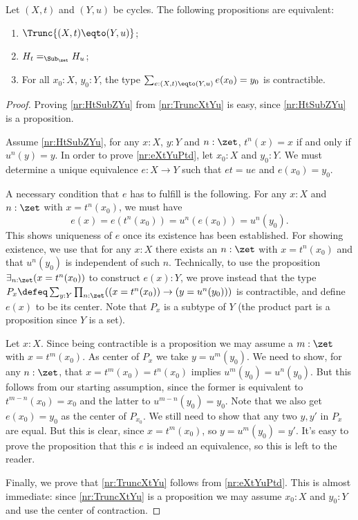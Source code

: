 \begin{lemma}\label{lem:IdCycle}
Let $(X,t)$ and $(Y,u)$ be cycles. The following propositions
are equivalent:
\begin{enumerate}
\item\label{nr:TruncXtYu} $\Trunc{(X,t)\eqto(Y,u)}$;
\item\label{nr:HtSubZYu} $H_t =_{\Sub_\zet} H_u$;
\item\label{nr:eXtYuPtd} For all $x_0:X$, $y_0:Y$, the type
$\sum_{e:(X,t)\eqto(Y,u)} e(x_0) = y_0$ is contractible.
\end{enumerate}
\end{lemma}
\begin{proof}
  Proving \ref{nr:HtSubZYu} from \ref{nr:TruncXtYu} is easy,
  since \ref{nr:HtSubZYu} is a proposition.
  
  Assume \ref{nr:HtSubZYu}, \ie for any $x:X$, $y:Y$ and $n:\zet$,
  $t^n(x)=x$ if and only if $u^n(y)=y$. In order to prove \ref{nr:eXtYuPtd},
  let $x_0:X$ and $y_0:Y$. We must determine a unique equivalence
  $e:X\to Y$ such that $et=ue$ and $e(x_0)=y_0$.

  A necessary condition that $e$ has to fulfill is the following. 
  For any $x:X$ and $n:\zet$ with $x=t^n(x_0)$, we must have
  \[
    e(x)=e(t^n(x_0))=u^n(e(x_0))=u^n(y_0).
  \]
  This shows uniqueness of $e$ once its existence has been established.
  For showing existence, we use that for any $x:X$ there exists an
  $n:\zet$ with $x=t^n(x_0)$ and that $u^n(y_0)$ is independent of such $n$.
  Technically, to use the proposition $\exists_{n:\zet}(x=t^n(x_0))$ to
  construct $e(x):Y$, we prove instead that the type 
  $P_x\defeq\sum_{y:Y}\prod_{n:\zet}((x=t^n(x_0)) \to (y=u^n(y_0)))$
  is contractible, and define $e(x)$ to be its center.
  Note that $P_x$ is a subtype of $Y$
  (the product part is a proposition since $Y$ is a set).
  
  Let $x:X$. Since being contractible is a proposition we may
  assume a $m:\zet$ with $x=t^{m}(x_0)$.
  As center of $P_x$ we take $y=u^{m}(y_0)$.
  We need to show, for any $n:\zet$,
  that $x=t^m(x_0)=t^n(x_0)$ implies $u^m(y_0)=u^n(y_0)$.
  But this follows from our starting assumption, since
  the former is equivalent to $t^{m-n}(x_0)=x_0$
  and the latter to $u^{m-n}(y_0)=y_0$.
  Note that we also get $e(x_0)=y_0$ as the center of $P_{x_0}$.
  We still need to show that any two $y,y'$ in $P_x$ are equal.
  But this is clear, since $x=t^{m}(x_0)$, so $y=u^{m}(y_0)=y'$.
  It's easy to prove the proposition that this $e$ is indeed 
  an equivalence, so this is left to the reader.
  
  Finally, we prove that \ref{nr:TruncXtYu} follows from \ref{nr:eXtYuPtd}.
  This is almost immediate: since \ref{nr:TruncXtYu} is a proposition
  we may assume $x_0:X$ and $y_0:Y$ and use the center of contraction.
\end{proof}



